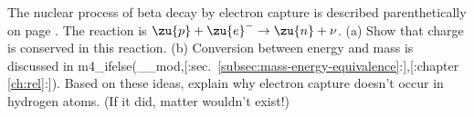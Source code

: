 The nuclear process of beta decay by electron capture
        is described parenthetically on page \pageref{electroncapture}. The reaction is
        $\zu{p}+\zu{e}^- \rightarrow \zu{n}+\nu$.\hwendpart
        (a) Show that charge is conserved in this
        reaction. \hwendpart
        (b) Conversion between energy and mass is
        discussed in m4_ifelse(__mod,[:sec.~\ref{subsec:mass-energy-equivalence}:],[:chapter \ref{ch:rel}:]). Based on
        these ideas, explain why electron capture doesn't occur in
        hydrogen atoms. (If it did, matter wouldn't exist!)
